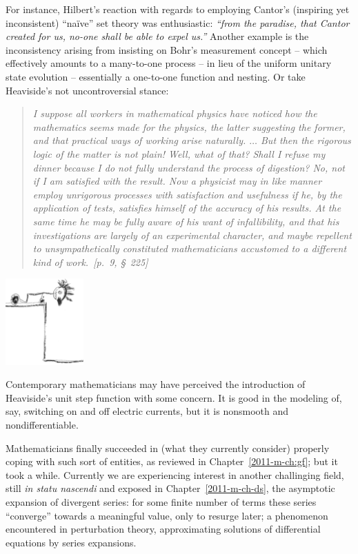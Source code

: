 For instance, Hilbert's reaction with regards to employing
Cantor's (inspiring yet inconsistent) ``na\"ive'' set theory was enthusiastic\cite{hilbert-26}:
{\em ``from the paradise, that Cantor created for us, no-one shall be able to expel us.''}
Another example is the inconsistency arising from insisting on Bohr's measurement concept
-- which effectively amounts to a many-to-one process --
in lieu of the uniform unitary state evolution -- essentially a one-to-one function
and nesting.
Or take  Heaviside's not uncontroversial stance\cite{heaviside-EMT}:
\begin{quote}
{\em
I suppose all workers
in mathematical physics have noticed how the mathematics
seems made for the physics, the latter suggesting the former, and
that practical ways of working arise naturally. $\ldots$ But then the
rigorous logic of the matter is not plain! Well, what of that?
Shall I refuse my dinner because I do not fully understand the
process of digestion? No, not if I am satisfied with the result.
Now a physicist may in like manner employ unrigorous processes with satisfaction and usefulness if he, by the application
of tests, satisfies himself of the accuracy of his results. At
the same time he may be fully aware of his want of infallibility,
and that his investigations are largely of an experimental character, and maybe repellent to unsympathetically
constituted mathematicians accustomed to a different kind
of work.~[p.~9, \S~225]
}
\label{2013-m-ch-intro-cooking}
\end{quote}
\begin{marginfigure}
\begin{center}
\includegraphics[width=3cm]{2019-mm-cartoon-Heaviside2}
\caption{Contemporary mathematicians may have perceived the introduction of Heaviside's unit step function with some concern.
It is good in the modeling of, say, switching on and off electric currents, but it is nonsmooth and nondifferentiable.}
\label{2018-m-cartoon-Heaviside1}
\end{center}
\end{marginfigure}
Mathematicians finally succeeded in (what they currently consider)
properly coping with such sort of entities, as reviewed in Chapter~\ref{2011-m-ch:gf}; but it took a while.
Currently we are experiencing interest in another challinging field, still {\it in statu nascendi} and
exposed in Chapter~\ref{2011-m-ch-ds}, the  asymptotic expansion of divergent series:
for some finite number of terms these series ``converge'' towards a meaningful value, only to resurge  later;
a phenomenon encountered in perturbation theory, approximating solutions of differential equations by series expansions.


